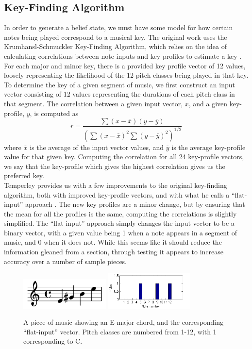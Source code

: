 \documentclass[11pt]{article} %
\newcommand*\mean[1]{\bar{#1}}
\begin{document}
\subsection{Key-Finding Algorithm}
In order to generate a belief state, we must have some model for how certain notes being played correspond to a musical key. The original work uses the Krumhansl-Schmuckler Key-Finding Algorithm, which relies on the idea of calculating correlations between note inputs and key profiles to estimate a key \cite{clk1990}. %
For each major and minor key, there is a provided key profile vector of 12 values, loosely representing the likelihood of the 12 pitch classes being played in that key. To determine the key of a given segment of music, we first construct an input vector consisting of 12 values representing the durations of each pitch class in that segment. The correlation between a given input vector, $x$, and a given key-profile, $y$, is computed as
\[
	r= \frac{\sum(x-\mean{x})(y-\mean{y})}{(\sum(x-\mean{x})^2\sum(y-\mean{y})^2)^{1/2}}
\]
where $\mean{x}$ is the average of the input vector values, and $\mean{y}$ is the average key-profile value for that given key. Computing the correlation for all 24 key-profile vectors, we say that the key-profile which gives the highest correlation gives us the preferred key. \\
Temperley provides us with a few improvements to the original key-finding algorithm, both with improved key-profile vectors, and with what he calls a ``flat-input'' approach \cite{temperley1999}. The new key profiles are a minor change, but by ensuring that the mean for all the profiles is the same, computing the correlations is slightly simplified. The ``flat-input'' approach simply changes the input vector to be a binary vector, with a given value being 1 when a note appears in a segment of music, and 0 when it does not. While this seems like it should reduce the information gleaned from a section, through testing it appears to increase accuracy over a number of sample pieces.

\begin{figure}[h]
\centering
\includegraphics[width=0.4\textwidth]{emaj.png}
\includegraphics[width=0.4\textwidth]{emajvector.png}
\caption{A piece of music showing an E major chord, and the corresponding ``flat-input'' vector. Pitch classes are numbered from 1-12, with 1 corresponding to C.}
\label{fig:inputvector}
\end{figure}
\end{document}
